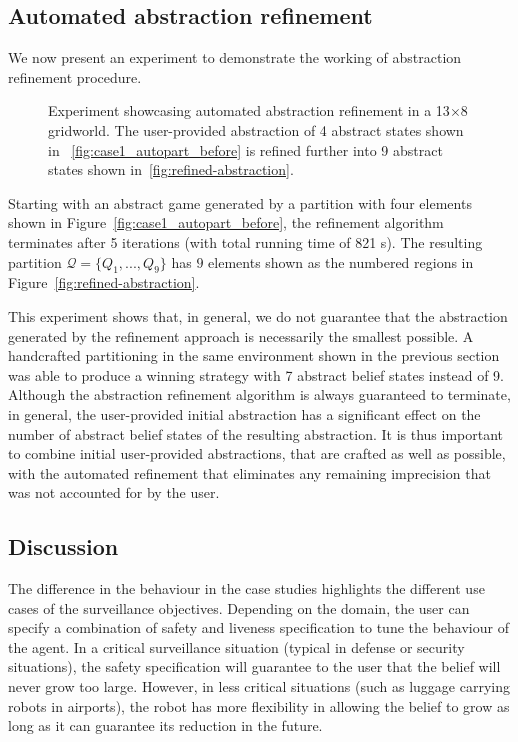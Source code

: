 \subsection{Automated abstraction refinement}
We now present an experiment to demonstrate the working of abstraction refinement procedure. 


\begin{figure}
\hfill
{}
\caption{Experiment showcasing automated abstraction refinement in a 13$\times$8 gridworld. The user-provided abstraction of 4 abstract states shown in ~\ref{fig:case1_autopart_before} is refined further into 9 abstract states shown in~\ref{fig:refined-abstraction}.}
\label{fig:case1_autopart}
\end{figure}



Starting with an abstract game generated by a partition with four elements shown in Figure~\ref{fig:case1_autopart_before}, the refinement algorithm terminates after 5 iterations (with total running time of 821 s). The resulting partition $\mathcal{Q} = \{Q_1,...,Q_9 \}$ has $9$ elements shown as the numbered regions in Figure~\ref{fig:refined-abstraction}.

This experiment shows that, in general, we do not guarantee that the abstraction generated by the refinement approach is necessarily the smallest possible. A handcrafted partitioning in the same environment shown in the previous section was able to produce a winning strategy with 7 abstract belief states instead of 9. Although the abstraction refinement algorithm is always guaranteed to terminate, in general, the user-provided initial abstraction has a significant effect on the number of abstract belief states of the resulting abstraction. It is thus important to combine initial user-provided abstractions, that are crafted as well as possible, with the automated refinement that eliminates any remaining imprecision that was not accounted for by the user.

 



\subsection{Discussion}
 The difference in the behaviour in the case studies highlights the different use cases of the surveillance objectives. Depending on the domain, the user can specify a combination of safety and liveness specification to tune the behaviour of the agent. In a critical surveillance situation (typical in defense or security situations), the safety specification will guarantee to the user that the belief will never grow too large. However, in less critical situations (such as luggage carrying robots in airports), the robot has more flexibility in allowing the belief to grow as long as it can guarantee its reduction in the future. 